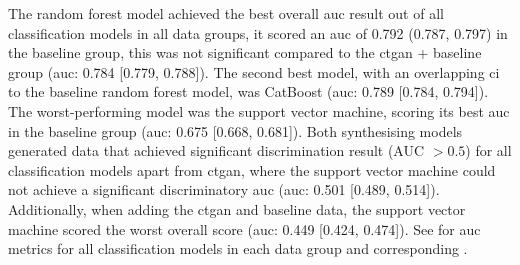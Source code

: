 \documentclass[12pt, a4paper]{article}
\begin{document}
The random forest model achieved the best overall \acrshort{auc} result out of all classification models in all data
groups, it scored an \acrshort{auc} of 0.792 (0.787, 0.797) in the baseline group, this was not significant compared to
the \acrshort{ctgan} + baseline group (\acrshort{auc}: 0.784 [0.779, 0.788]). The second best model, with an
overlapping \acrshort{ci} to the baseline random forest model, was CatBoost (\acrshort{auc}: 0.789 [0.784, 0.794]). The
worst-performing model was the support vector machine, scoring its best \acrshort{auc} in the baseline group
(\acrshort{auc}: 0.675 [0.668, 0.681]). Both synthesising models generated data that achieved significant
discrimination result (AUC $> 0.5$) for all classification models apart from \acrshort{ctgan}, where the support vector
machine could not achieve a significant discriminatory \acrshort{auc} (\acrshort{auc}: 0.501 [0.489, 0.514]).
Additionally, when adding the \acrshort{ctgan} and baseline data, the support vector machine scored the worst overall
score (\acrshort{auc}: 0.449 [0.424, 0.474]). See  for \acrshort{auc} metrics for all
classification models in each data group and corresponding .
\end{document}
